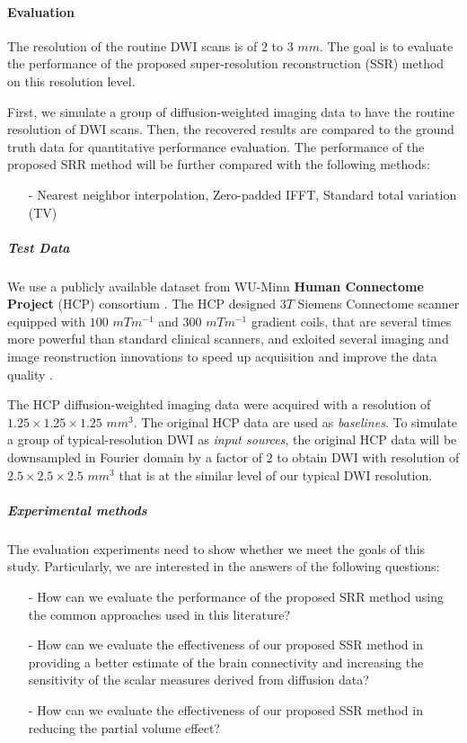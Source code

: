 \paragraph{Evaluation}

The resolution of the routine DWI scans is of $2$ to $3$ $mm$. The goal is to evaluate the performance of the proposed super-resolution reconstruction (SSR) method on this resolution level. 

First, we simulate a group of diffusion-weighted imaging data to have the routine resolution of DWI scans. Then, the recovered results are compared to the ground truth data for quantitative performance evaluation.
The performance of the proposed SRR method will be further compared with the following methods:
\begin{itemize}
\item[-] Nearest neighbor interpolation, Zero-padded IFFT, Standard total variation (TV)
\end{itemize}

\subparagraph{Test Data}
\label{HCPData}

We use a publicly available dataset from WU-Minn \textbf{Human Connectome Project} (HCP) consortium \cite{van2013,sotiropoulos2013}.
The HCP designed $3T$ Siemens Connectome scanner equipped with $100$ $mTm^{-1}$ and $300$ $mTm^{-1}$ gradient coils, that are several times more powerful than standard clinical scanners, and exloited several imaging and image reonstruction innovations to speed up acquisition and improve the data quality \cite{sotiropoulos2013}.

The HCP diffusion-weighted imaging data were acquired with a resolution of $1.25 \times 1.25 \times 1.25$ $mm^3$. 
The original HCP data are used as \textit{baselines}.
To simulate a group of typical-resolution DWI as \textit{input sources}, the original HCP data will be downsampled in Fourier domain by a factor of $2$ to obtain DWI with resolution of $2.5 \times 2.5 \times 2.5$ $mm^3$ that is at the similar level of our typical DWI resolution.
\newline

\subparagraph{Experimental methods}

The evaluation experiments need to show whether we meet the goals of this study. Particularly, we are interested in the answers of the following questions:
\begin{itemize}
    \item[-] How can we evaluate the performance of the proposed SRR method using the common approaches used in this literature?
    \item[-] How can we evaluate the effectiveness of our proposed SSR method in providing a better estimate of the brain connectivity and increasing the sensitivity of the scalar measures derived from diffusion data?
    \item[-] How can we evaluate the effectiveness of our proposed SSR method in reducing the partial volume effect?
\end{itemize}

